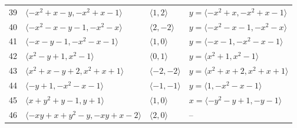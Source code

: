 \documentclass[11pt]{article}
\begin{document}
\begin{longtable}{@{}rlll@{}}
39 & $\langle -x^{2}+x-y,-x^{2}+x-1\rangle$ & $\langle 1,2\rangle$ & $y=\langle -x^{2}+x,-x^{2}+x-1\rangle$\\
40 & $\langle -x^{2}-x-y-1,-x^{2}-x\rangle$ & $\langle 2,-2\rangle$ & $y=\langle -x^{2}-x-1,-x^{2}-x\rangle$\\
41 & $\langle -x-y-1,-x^{2}-x-1\rangle$ & $\langle 1,0\rangle$ & $y=\langle -x-1,-x^{2}-x-1\rangle$\\
42 & $\langle x^{2}-y+1,x^{2}-1\rangle$ & $\langle 0,1\rangle$ & $y=\langle x^{2}+1,x^{2}-1\rangle$\\
43 & $\langle x^{2}+x-y+2,x^{2}+x+1\rangle$ & $\langle -2,-2\rangle$ & $y=\langle x^{2}+x+2,x^{2}+x+1\rangle$\\
44 & $\langle -y+1,-x^{2}-x-1\rangle$ & $\langle -1,-1\rangle$ & $y=\langle 1,-x^{2}-x-1\rangle$\\
45 & $\langle x+y^{2}+y-1,y+1\rangle$ & $\langle 1,0\rangle$ & $x=\langle -y^{2}-y+1,-y-1\rangle$\\
46 & $\langle -xy+x+y^{2}-y,-xy+x-2\rangle$ & $\langle 2,0\rangle$ & --\\
\end{longtable}
\endgroup
\end{document}
